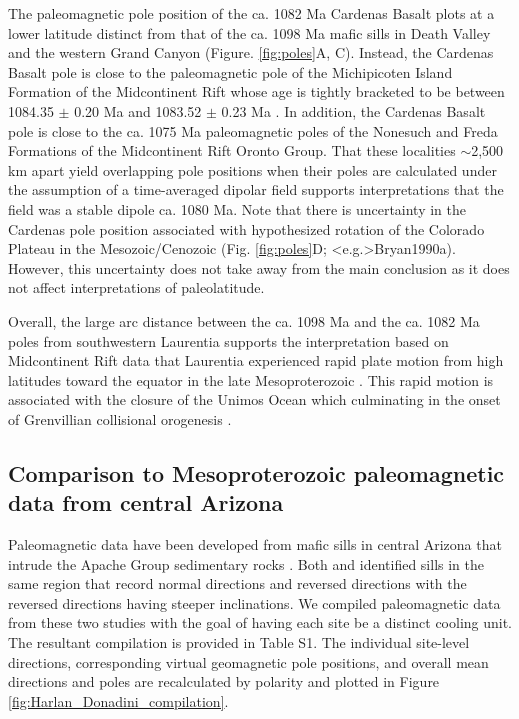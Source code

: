 \documentclass[draft]{agujournal2019}
\begin{document}
The paleomagnetic pole position of the ca. 1082 Ma Cardenas Basalt plots at a lower latitude distinct from that of the ca. 1098 Ma mafic sills in Death Valley and the western Grand Canyon (Figure. \ref{fig:poles}A, C). Instead, the Cardenas Basalt pole is close to the paleomagnetic pole of the Michipicoten Island Formation of the Midcontinent Rift whose age is tightly bracketed to be between 1084.35 $\pm$ 0.20 Ma and 1083.52 $\pm$ 0.23 Ma \cite{Fairchild2017a}. In addition, the Cardenas Basalt pole is close to the ca. 1075 Ma paleomagnetic poles of the Nonesuch and Freda Formations \cite{Henry1977a, Slotznick2023a} of the Midcontinent Rift Oronto Group. That these localities $\sim$2,500 km apart yield overlapping pole positions when their poles are calculated under the assumption of a time-averaged dipolar field supports interpretations that the field was a stable dipole ca. 1080 Ma. Note that there is uncertainty in the Cardenas pole position associated with hypothesized rotation of the Colorado Plateau in the Mesozoic/Cenozoic (Fig. \ref{fig:poles}D; \citeA<e.g.>{Bryan1990a}). However, this uncertainty does not take away from the main conclusion as it does not affect interpretations of paleolatitude.

Overall, the large arc distance between the ca. 1098 Ma and the ca. 1082 Ma poles from southwestern Laurentia supports the interpretation based on Midcontinent Rift data that Laurentia experienced rapid plate motion from high latitudes toward the equator in the late Mesoproterozoic \cite{Davis1997a, Swanson-Hysell2009a}. This rapid motion is associated with the closure of the Unimos Ocean which culminating in the onset of Grenvillian collisional orogenesis \cite{Swanson-Hysell2023a}. 

\subsection*{Comparison to Mesoproterozoic paleomagnetic data from central Arizona}

Paleomagnetic data have been developed from mafic sills in central Arizona that intrude the Apache Group sedimentary rocks \cite{Helsley1972a, Harlan1993a, Donadini2011a}. Both  and  identified sills in the same region that record normal directions and reversed directions with the reversed directions having steeper inclinations. We compiled paleomagnetic data from these two studies with the goal of having each site be a distinct cooling unit. The resultant compilation is provided in Table S1. The individual site-level directions, corresponding virtual geomagnetic pole positions, and overall mean directions and poles are recalculated by polarity and plotted in Figure \ref{fig:Harlan_Donadini_compilation}. 
\end{document}
